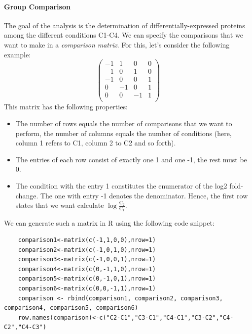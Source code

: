 \paragraph{Group Comparison}
The goal of the analysis is the determination of differentially-expressed
proteins among the different conditions C1-C4.
We can specify the comparisons that we want to make in a
\emph{comparison matrix}. For this, let's consider the following example:
\begin{equation}
	\begin{pmatrix}
	-1 & 1  & 0 & 0 \\
	-1 & 0  & 1 & 0 \\
	-1 & 0  & 0 & 1 \\
	 0 & -1 & 0 & 1 \\
	 0 & 0  & -1 & 1 \\
	\end{pmatrix}
\end{equation}
This matrix has the following properties:
\begin{itemize}
	\item
	The number of rows equals the number of comparisons that we want to
	perform, the number of columns equals the number of conditions
	(here, column 1 refers to C1, column 2 to C2 and so forth).
	\item 
	The entries of each row consist of exactly one 1 and one -1, the
	rest must be 0.
	\item 
	The condition with the entry 1 constitutes the enumerator
	of the log2 fold-change. The one with entry -1 denotes the 
	denominator.
	Hence, the first row states that we want calculate
	$\log \frac{\text{C}_2}{\text{C}_1}$.
\end{itemize}

We can generate such a matrix in R using the following code snippet:
\begin{lstlisting}
	comparison1<-matrix(c(-1,1,0,0),nrow=1)
	comparison2<-matrix(c(-1,0,1,0),nrow=1)
	comparison3<-matrix(c(-1,0,0,1),nrow=1)
	comparison4<-matrix(c(0,-1,1,0),nrow=1)
	comparison5<-matrix(c(0,-1,0,1),nrow=1)
	comparison6<-matrix(c(0,0,-1,1),nrow=1)
	comparison <- rbind(comparison1, comparison2, comparison3, comparison4, comparison5, comparison6)
	row.names(comparison)<-c("C2-C1","C3-C1","C4-C1","C3-C2","C4-C2","C4-C3")
\end{lstlisting}




